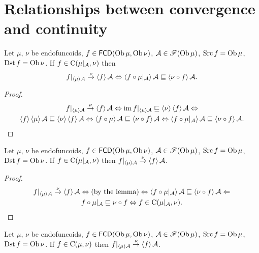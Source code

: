 \section{Relationships between convergence and continuity}
\begin{lem}
Let $\mu$, $\nu$ be endofuncoids, $f\in\mathsf{FCD}(\operatorname{Ob}\mu,\operatorname{Ob}\nu)$,
$\mathcal{A}\in\mathscr{F}(\operatorname{Ob}\mu)$, $\operatorname{Src} f=\operatorname{Ob}\mu$, $\operatorname{Dst} f=\operatorname{Ob}\nu$.
If $f\in\mathrm{C}(\mu|_{\mathcal{A}},\nu)$ then
\[
f|_{\left\langle \mu\right\rangle\mathcal{A}}\overset{\nu}{\rightarrow}\left\langle f\right\rangle\mathcal{A}\Leftrightarrow\left\langle f\circ\mu|_{\mathcal{A}}\right\rangle\mathcal{A}\sqsubseteq\left\langle \nu\circ f\right\rangle\mathcal{A}.
\]
\end{lem}
\begin{proof}
~
\begin{multline*}
f|_{\left\langle \mu\right\rangle\mathcal{A}}\overset{\nu}{\rightarrow}\left\langle f\right\rangle\mathcal{A}\Leftrightarrow\operatorname{im} f|_{\left\langle \mu\right\rangle\mathcal{A}}\sqsubseteq\left\langle \nu\right\rangle\left\langle f\right\rangle\mathcal{A}\Leftrightarrow\\
\left\langle f\right\rangle\left\langle \mu\right\rangle\mathcal{A}\sqsubseteq\left\langle \nu\right\rangle\left\langle f\right\rangle\mathcal{A}\Leftrightarrow\left\langle f\circ\mu\right\rangle\mathcal{A}\sqsubseteq\left\langle \nu\circ f\right\rangle\mathcal{A}\Leftrightarrow\left\langle f\circ\mu|_{\mathcal{A}}\right\rangle\mathcal{A}\sqsubseteq\left\langle \nu\circ f\right\rangle\mathcal{A}.
\end{multline*}
\end{proof}
\begin{thm}
Let $\mu$, $\nu$ be endofuncoids, $f\in\mathsf{FCD}(\operatorname{Ob}\mu,\operatorname{Ob}\nu)$,
$\mathcal{A}\in\mathscr{F}(\operatorname{Ob}\mu)$, $\operatorname{Src} f=\operatorname{Ob}\mu$, $\operatorname{Dst} f=\operatorname{Ob}\nu$.
If $f\in\mathrm{C}(\mu|_{\mathcal{A}},\nu)$ then $f|_{\left\langle \mu\right\rangle\mathcal{A}}\overset{\nu}{\rightarrow}\left\langle f\right\rangle\mathcal{A}$.\end{thm}
\begin{proof}
~
\begin{multline*}
f|_{\left\langle \mu\right\rangle\mathcal{A}}\overset{\nu}{\rightarrow}\left\langle f\right\rangle\mathcal{A}\Leftrightarrow\text{(by the lemma)}\Leftrightarrow\left\langle f\circ\mu|_{\mathcal{A}}\right\rangle\mathcal{A}\sqsubseteq\left\langle \nu\circ f\right\rangle\mathcal{A}\Leftarrow\\
f\circ\mu|_{\mathcal{A}}\sqsubseteq\nu\circ f\Leftrightarrow f\in\mathrm{C}(\mu|_{\mathcal{A}},\nu).
\end{multline*}
\end{proof}
\begin{cor}
Let $\mu$, $\nu$ be endofuncoids, $f\in\mathsf{FCD}(\operatorname{Ob}\mu,\operatorname{Ob}\nu)$,
$\mathcal{A}\in\mathscr{F}(\operatorname{Ob}\mu)$, $\operatorname{Src} f=\operatorname{Ob}\mu$, $\operatorname{Dst} f=\operatorname{Ob}\nu$.
If $f\in\mathrm{C}(\mu,\nu)$ then $f|_{\left\langle \mu\right\rangle\mathcal{A}}\overset{\nu}{\rightarrow}\left\langle f\right\rangle\mathcal{A}$.\end{cor}
